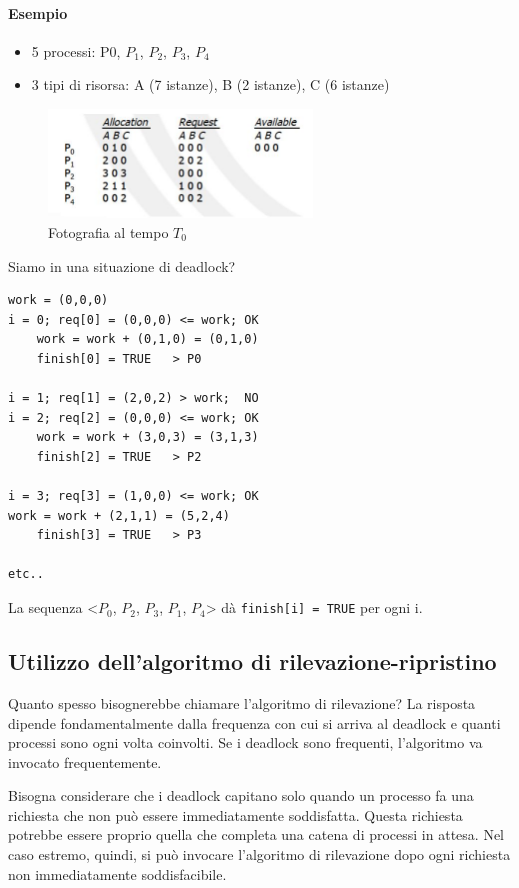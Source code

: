 \documentclass[a4paper]{article}
\begin{document}
\paragraph{Esempio}
\begin{itemize}
    \item 5 processi: P0, $P_1$, $P_2$, $P_3$, $P_4$
    \item 3 tipi di risorsa: A (7 istanze), B (2 istanze), C (6 istanze)
\end{itemize}

\begin{figure}[htb]
    \caption{Fotografia al tempo $T_0$}
    \centering
    \includegraphics[width=7cm]{img/ril1.JPG}
\end{figure}

Siamo in una situazione di deadlock?
\begin{Verbatim}[tabsize=3]
work = (0,0,0)
i = 0; req[0] = (0,0,0) <= work; OK
    work = work + (0,1,0) = (0,1,0)
    finish[0] = TRUE   > P0

i = 1; req[1] = (2,0,2) > work;  NO
i = 2; req[2] = (0,0,0) <= work; OK
    work = work + (3,0,3) = (3,1,3)
    finish[2] = TRUE   > P2

i = 3; req[3] = (1,0,0) <= work; OK
work = work + (2,1,1) = (5,2,4)
    finish[3] = TRUE   > P3

etc..
\end{Verbatim}

La sequenza <$P_0$, $P_2$, $P_3$, $P_1$, $P_4$> dà \verb|finish[i] = TRUE| per ogni i.

\subsection{Utilizzo dell'algoritmo di rilevazione-ripristino}
Quanto spesso bisognerebbe chiamare l'algoritmo di rilevazione? La risposta dipende fondamentalmente dalla frequenza con cui si arriva al deadlock e quanti processi sono ogni volta coinvolti. Se i deadlock sono frequenti, l'algoritmo va invocato frequentemente.

Bisogna considerare che i deadlock capitano solo quando un processo fa una richiesta che non può essere immediatamente soddisfatta. Questa richiesta potrebbe essere proprio quella che completa una catena di processi in attesa. Nel caso estremo, quindi, si può invocare l'algoritmo di rilevazione dopo ogni richiesta non immediatamente soddisfacibile.
\end{document}

